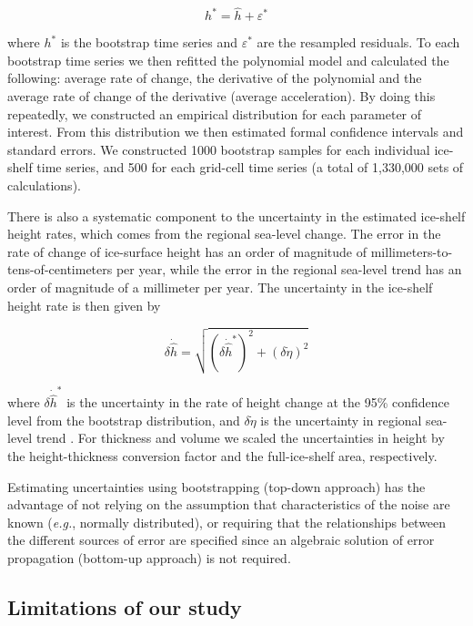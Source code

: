 \begin{equation}
  h^* = \hat h + \varepsilon^* 
\end{equation}

where $h^*$ is the bootstrap time series and $\varepsilon^*$ are the resampled
residuals. To each bootstrap time series we then refitted the polynomial model
and calculated the following: average rate of change, the derivative of the
polynomial and the average rate of change of the derivative (average
acceleration). By doing this repeatedly, we constructed an empirical
distribution for each parameter of interest. From this distribution we then
estimated formal confidence intervals and standard errors. We constructed 1000
bootstrap samples for each individual ice-shelf time series, and 500 for each
grid-cell time series (a total of 1,330,000 sets of calculations).

There is also a systematic component to the uncertainty in the estimated
ice-shelf height rates, which comes from the regional sea-level change. The
error in the rate of change of ice-surface height has an order of magnitude of
millimeters-to-tens-of-centimeters per year, while the error in the regional
sea-level trend has an order of magnitude of a millimeter per year. The
uncertainty in the ice-shelf height rate is then given by

\begin{equation}
  \delta \dot{\hat h} = \sqrt{(\delta \dot{\hat h}^*)^2 + (\delta \dot \eta)^2}
\end{equation}

where $\delta \dot{\hat h}^*$ is the uncertainty in the rate of height change
at the 95\% confidence level from the bootstrap distribution, and
$\delta \dot \eta$ is the uncertainty in regional sea-level trend
\parencite{LeTraon1998}. For thickness and volume we scaled the uncertainties
in height by the height-thickness conversion factor and the full-ice-shelf
area, respectively.

Estimating uncertainties using bootstrapping (top-down approach) has the
advantage of not relying on the assumption that characteristics of the noise
are known ({\it e.g.}, normally distributed), or requiring that the relationships
between the different sources of error are specified since an algebraic
solution of error propagation (bottom-up approach) is not required.

\subsection*{Limitations of our study}

